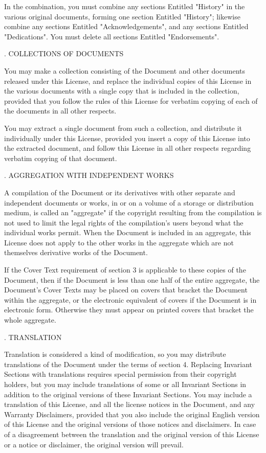 In the combination, you must combine any sections Entitled "History" in the various original documents, forming one section Entitled "History"; likewise combine any sections Entitled "Acknowledgements", and any sections Entitled "Dedications". You must delete all sections Entitled "Endorsements".

. COLLECTIONS OF DOCUMENTS

You may make a collection consisting of the Document and other documents released under this License, and replace the individual copies of this License in the various documents with a single copy that is included in the collection, provided that you follow the rules of this License for verbatim copying of each of the documents in all other respects.

You may extract a single document from such a collection, and distribute it individually under this License, provided you insert a copy of this License into the extracted document, and follow this License in all other respects regarding verbatim copying of that document.

. AGGREGATION WITH INDEPENDENT WORKS

A compilation of the Document or its derivatives with other separate and independent documents or works, in or on a volume of a storage or distribution medium, is called an "aggregate" if the copyright resulting from the compilation is not used to limit the legal rights of the compilation's users beyond what the individual works permit. When the Document is included in an aggregate, this License does not apply to the other works in the aggregate which are not themselves derivative works of the Document.

If the Cover Text requirement of section 3 is applicable to these copies of the Document, then if the Document is less than one half of the entire aggregate, the Document's Cover Texts may be placed on covers that bracket the Document within the aggregate, or the electronic equivalent of covers if the Document is in electronic form. Otherwise they must appear on printed covers that bracket the whole aggregate.

. TRANSLATION

Translation is considered a kind of modification, so you may distribute translations of the Document under the terms of section 4. Replacing Invariant Sections with translations requires special permission from their copyright holders, but you may include translations of some or all Invariant Sections in addition to the original versions of these Invariant Sections. You may include a translation of this License, and all the license notices in the Document, and any Warranty Disclaimers, provided that you also include the original English version of this License and the original versions of those notices and disclaimers. In case of a disagreement between the translation and the original version of this License or a notice or disclaimer, the original version will prevail.


